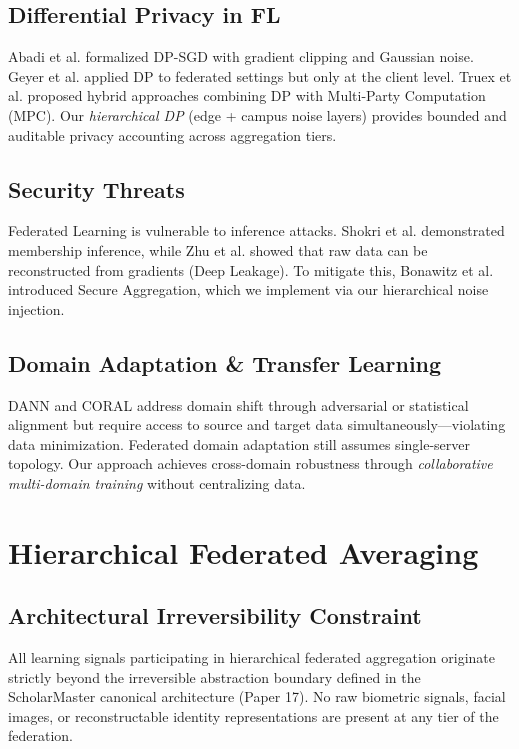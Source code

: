 \documentclass[conference]{IEEEtran}
\begin{document}
\subsection{Differential Privacy in FL}

Abadi et al. formalized DP-SGD with gradient clipping and Gaussian noise. Geyer et al. applied DP to federated settings but only at the client level. Truex et al. proposed hybrid approaches combining DP with Multi-Party Computation (MPC). Our \textit{hierarchical DP} (edge + campus noise layers) provides bounded and auditable privacy accounting across aggregation tiers.

\subsection{Security Threats}
Federated Learning is vulnerable to inference attacks. Shokri et al. demonstrated membership inference, while Zhu et al. showed that raw data can be reconstructed from gradients (Deep Leakage). To mitigate this, Bonawitz et al. introduced Secure Aggregation, which we implement via our hierarchical noise injection.

\subsection{Domain Adaptation \& Transfer Learning}

DANN and CORAL address domain shift through adversarial or statistical alignment but require access to source and target data simultaneously---violating data minimization. Federated domain adaptation still assumes single-server topology. Our approach achieves cross-domain robustness through \textit{collaborative multi-domain training} without centralizing data.

\section{Hierarchical Federated Averaging}

\subsection{Architectural Irreversibility Constraint}

All learning signals participating in hierarchical federated aggregation originate strictly beyond the irreversible abstraction boundary defined in the ScholarMaster canonical architecture (Paper 17). No raw biometric signals, facial images, or reconstructable identity representations are present at any tier of the federation.
\end{document}

